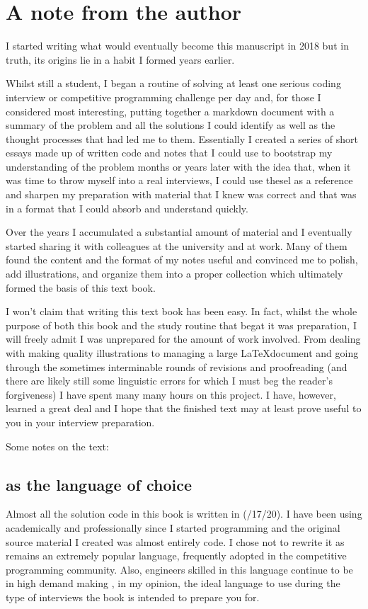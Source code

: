 \chapter*{A note from the author}
I started writing what would eventually become this manuscript in 2018 but in truth, its origins lie in a habit I formed years earlier. 

Whilst still a student, I began a routine of solving at least one serious coding interview or competitive programming challenge per day and, for those I considered most interesting, putting together a markdown document with a summary of the problem and all the solutions I could identify as well as the thought processes that had led me to them.  Essentially I created a series of short essays made up of written code and notes that I could use to bootstrap my understanding of the problem months or years later with the idea that, when it was time to throw myself into a real interviews,  I could use thesel as a reference and sharpen my preparation with material that I knew was correct and that was in a format that I could absorb and understand quickly.

Over the years I accumulated a substantial amount of material and I eventually started sharing it with colleagues at the university and at work.  Many of them found the content and the format of my notes useful and convinced me to polish, add illustrations, and organize them into a proper collection which ultimately formed the basis of this text book. 

I won’t claim that writing this text book has been easy. In fact, whilst the whole purpose of both this book and the study routine that begat it was preparation, I will freely admit I was unprepared for the amount of work involved. From dealing with making quality illustrations to managing a large \LaTeX document and going through the sometimes interminable rounds of revisions and proofreading (and there are likely still some linguistic errors  for which I must beg the reader’s forgiveness)  I have spent many many hours on this project. I have, however, learned a great deal and I hope that the finished text may at least prove useful to you in your interview preparation. 


Some notes on the text:  

\section*{\protect \CC as the language of choice}
Almost all the solution code in this book is written in \CC (/17/20). 
I have been using \CC academically and professionally since I started programming and the original source material I created was almost entirely \CC code. 
I chose not to rewrite it  as  \CC remains an extremely popular language, frequently adopted in the competitive programming community. Also, engineers skilled in this language continue to be in high demand making \CC, in my opinion, the ideal language to use during the type of interviews the book is intended to prepare you for. 


